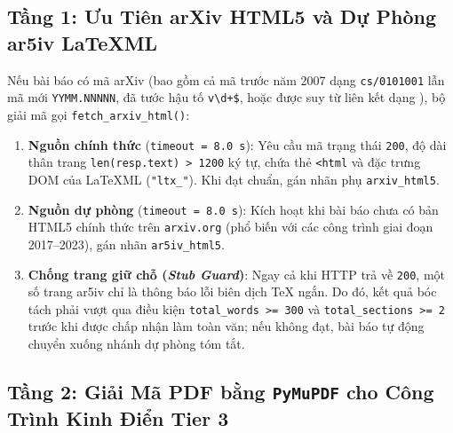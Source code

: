 \subsection{Tầng 1: Ưu Tiên arXiv HTML5 và Dự Phòng ar5iv LaTeXML}
\label{sec:ch2_tier1_html5}

Nếu bài báo có mã arXiv (bao gồm cả mã trước năm 2007 dạng \texttt{cs/0101001} lẫn mã mới \texttt{YYMM.NNNNN}, đã tước hậu tố \texttt{v\textbackslash d+\$}, hoặc được suy từ liên kết  dạng ), bộ giải mã gọi \texttt{fetch\_arxiv\_html()}:
\begin{enumerate}[label=\textbf{\arabic*.}]
  \item \textbf{Nguồn chính thức } (\texttt{timeout = 8.0 s}): Yêu cầu mã trạng thái \texttt{200}, độ dài thân trang \texttt{len(resp.text) > 1200} ký tự, chứa thẻ \texttt{<html} và đặc trưng DOM của LaTeXML (\texttt{"ltx\_"}). Khi đạt chuẩn, gán nhãn phụ \texttt{arxiv\_html5}.
  \item \textbf{Nguồn dự phòng } (\texttt{timeout = 8.0 s}): Kích hoạt khi bài báo chưa có bản HTML5 chính thức trên \texttt{arxiv.org} (phổ biến với các công trình giai đoạn 2017--2023), gán nhãn \texttt{ar5iv\_html5}.
  \item \textbf{Chống trang giữ chỗ (\textit{Stub Guard})}: Ngay cả khi HTTP trả về \texttt{200}, một số trang ar5iv chỉ là thông báo lỗi biên dịch TeX ngắn. Do đó, kết quả bóc tách phải vượt qua điều kiện \texttt{total\_words >= 300} và \texttt{total\_sections >= 2} trước khi được chấp nhận làm toàn văn; nếu không đạt, bài báo tự động chuyển xuống nhánh dự phòng tóm tắt.
\end{enumerate}

\subsection{Tầng 2: Giải Mã PDF bằng \texttt{PyMuPDF} cho Công Trình Kinh Điển Tier 3}
\label{sec:ch2_tier2_pdf}

